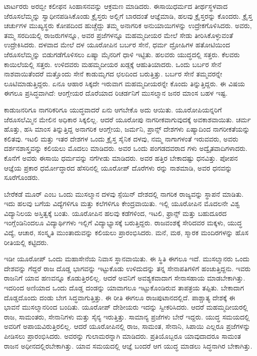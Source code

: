 \vskip 3pt

ಟಾರ್ಟರರು ಅರಬ್ಬೀ ಕಲೀಫನ ಸಿಂಹಾಸನವನ್ನು ಆಕ್ರಮಣ ಮಾಡಿದರು. ಈಸಾಯಿ\break ಧರ್ಮದ ತೀರ್ಥಸ್ಥಳವಾದ ಜೆರೂಸಲೆಮ್ಮನ್ನು ಸ್ವಾಧೀನಪಡಿಸಿಕೊಂಡು ಕ್ರೈಸ್ತರು ಅಲ್ಲಿಗೆ ಬಾರದಂತೆ ಆಜ್ಞೆಮಾಡಿ, ಹಲವು ಕ್ರೈಸ್ತರನ್ನು ಕೊಂದರು. ಕ್ರೈಸ್ತ ಚರ್ಚುಗಳ ಮುಖ್ಯಸ್ಥರು ಕೋಪದಿಂದ ಹುಚ್ಚೆದ್ದು ತಮ್ಮ ಅನಾಗರಿಕ ಅನುಯಾಯಿಗಳನ್ನು ಉದ್ರೇಕಗೊಳಿಸಿದರು. ಅವರು, ತಮ್ಮ ಸರದಿಯಲ್ಲಿ ರಾಜರುಗಳನ್ನೂ, ಅವರ ಪ್ರಜೆಗಳನ್ನೂ ಮಹಮ್ಮದೀಯರ ಮೇಲೆ ಸೇಡು ತೀರಿಸಿಕೊಳ್ಳುವಂತೆ ಉದ್ರೇಕಿಸಿದರು. ದಳವಾದ ಮೇಲೆ ದಳ ಯೂರೋಪಿನ ಬರ್ಬರ ಸೇನೆ, ಧರ್ಮ ದ್ರೋಹಿಗಳ ಹತೋಟಿಯಿಂದ ಜೆರೂಸಲೆಮ್ಮನ್ನು ಬಿಡುಗಡೆಗೊಳಿ\break ಸಲು ಏಷ್ಯಾ ಮೈನರಿಗೆ ಧಾಳಿ ಇಟ್ಟಿತು. ಹಲವರು ಯುದ್ಧದಲ್ಲಿ ಸತ್ತರು. ಕೆಲವರು ಕಾಯಿಲೆಯಲ್ಲಿ ಸತ್ತರು. ಉಳಿದವರು ಮಹಮ್ಮದೀಯರ ಖಡ್ಗಕ್ಕೆ ಆಹುತಿಯಾದರು. ಒಂದು ಬರ್ಬರ ಸೇನೆ ನಾಶವಾಯಿತೆಂದರೆ ಮತ್ತೊಂದು ಸೇನೆ ಕಾಡುಮೃಗದ ಛಲದಿಂದ ಬರುತ್ತಿತ್ತು. ಬರ್ಬರ ಸೇನೆ ತಮ್ಮವರನ್ನೇ ಲೂಟಿಮಾಡುತ್ತಿದ್ದರು. ಏನೂ ಆಹಾರ ಸಿಕ್ಕದೇ ಇರುವಾಗ ಮಹಮ್ಮದೀಯರನ್ನೇ ಕೊಂದು ತಿನ್ನುತ್ತಿದ್ದರು. ಈ ವಿಷಯ ಈಗಲೂ ಪ್ರಸಿದ್ಧ\break ವಾಗಿದೆ: ಆಂಗ್ಲೇಯರ ದೊರೆಯಾದ ರಿಚರ್ಡನಿಗೆ ಮುಸಲ್ಮಾನ ಜನರ ಮಾಂಸ ಬಹಳ ಇಷ್ಟ.

\vskip 3pt

ಕಾಡುಜನರಿಗೂ ನಾಗರಿಕರಿಗೂ ಯುದ್ಧವಾದರೆ ಏನು ಆಗಬೇಕೊ ಅದು ಆಯಿತು. ಯೂರೋಪಿಯನ್ನರಿಗೆ ಜೆರೂಸಲೆಮ್ಮಿನ ಮೇಲಿನ ಅಧಿಕಾರ ಸಿಕ್ಕಲಿಲ್ಲ. ಆದರೆ ಯೂರೋಪು ನಾಗರೀಕವಾಗುವುದಕ್ಕೆ ಅವಕಾಶವಾಯಿತು. ಚರ್ಮ ಹೊತ್ತು, ಹಸಿ ಮಾಂಸ ತಿನ್ನುತ್ತಿದ್ದ ಅನಾಗರಿಕ ಆಂಗ್ಲೇಯ, ಜರ್ಮನಿ, ಪ್ರಾನ್ಸ್​ ದೇಶಗಳು ಏಷ್ಯಾದಿಂದ ನಾಗರೀಕತೆಯನ್ನು ಕಲಿತವು. ಇಟಲಿ ಮತ್ತು ಇತರ ದೇಶಗಳ ಒಂದು ಕ್ರೈಸ್ತ ಸೈನಿಕ ದಳವು, ನಮ್ಮ ನಾಗಾಗಳಂತೆ ಇರುವವರು, ಅವರು ದರ್ಶನಶಾಸ್ತ್ರವನ್ನು ಕಲಿಯಲು ಮೊದಲು ಮಾಡಿದರು. ಅವರ ಒಂದು ಪಂಗಡದವರಾದ ಗಳು ಅದ್ವೈತವಾದಿಗಳಾದರು. ಕೊನೆಗೆ ಅವರು ಈಸಾಯಿ ಧರ್ಮವನ್ನು ನಗೆಗೀಡು ಮಾಡಿದರು. ಅವರ ಹತ್ತಿರ ಬೇಕಾದಷ್ಟು ಧನವಿತ್ತು. ಪೋಪನ ಆಜ್ಞೆಯ ಪ್ರಕಾರ ಧರ್ಮೋದ್ಧಾರದ ಹೆಸರಿನಲ್ಲಿ ಯೂರೋಪ್​ ದೊರೆಗಳು ರನ್ನು ನಾಶಮಾಡಿ, ಅವರ ಧನವನ್ನು ಸೂರೆಗೊಂಡರು.

\vskip 3pt

ಬೇರೆಕಡೆ ಮೂರ್​ ಎಂಬ ಒಂದು ಮುಸಲ್ಮಾನ ದಳವು ಸ್ಪೆಯಿನ್​ ದೇಶದಲ್ಲಿ ನಾಗರಿಕ ರಾಜ್ಯವನ್ನು ಸ್ಥಾಪನೆ ಮಾಡಿತು. ಇದು ಹಲವು ಬಗೆಯ ವಿದ್ಯೆಗಳಿಗೂ ಮತ್ತು ಕಲೆಗಳಿಗೂ ಕೇಂದ್ರವಾಯಿತು. ಇಲ್ಲಿ ಯೂರೋಪಿನ ಮೊದಲನೇ ವಿಶ್ವ ವಿದ್ಯಾನಿಲಯ ಅಸ್ತಿತ್ವಕ್ಕೆ ಬಂತು. ಯೂರೋಪಿನ ಹಲವು ಕಡೆಗಳಿಂದ, ಇಟಲಿ, ಫ್ರಾನ್ಸ್​ ಮತ್ತು ಬಹುದೂರದ ಇಂಗ್ಲೆಂಡಿನಿಂದಲೂ ವಿದ್ಯಾರ್ಥಿಗಳು ಇಲ್ಲಿಗೆ ವಿದ್ಯಾಭ್ಯಾಸಕ್ಕೆ ಬರುತ್ತಿದ್ದರು. ರಾಜವಂಶಕ್ಕೆ ಸೇರಿದವರ ಮಕ್ಕಳು, ಯುದ್ಧ ವಿದ್ಯೆ, ಆಚಾರ, ಸಂಸ್ಕೃತಿ ಮುಂತಾದುವನ್ನು ಕಲಿಯಲು ಪ್ರಾರಂಭಿಸಿದರು. ಮನೆ, ಮಠ, ಸ್ಮಾರಕ ಮಂದಿರಗಳನ್ನು ಹೊಸ ರೀತಿಯಲ್ಲಿ ಕಟ್ಟಿದರು.

\vskip 3pt

ಇಡೀ ಯೂರೋಪ್​ ಒಂದು ಮಹಾಸೇನೆಯ ನಿವಾಸ ಸ್ಥಾನವಾಯಿತು. ಈ ಸ್ಥಿತಿ ಈಗಲೂ ಇದೆ. ಮುಸಲ್ಮಾನರು ಒಂದು ದೇಶವನ್ನು ಗೆದ್ದರೆ ರಾಜ ದೊಡ್ಡ ಭಾಗವನ್ನು ಇಟ್ಟುಕೊಡು ಉಳಿದುದನ್ನು ತನ್ನ ಸೇನಾಪತಿಗಳಿಗೆ ಹಂಚುತ್ತಿದ್ದನು. ಇವರು ರಾಜನಿಗೆ ಯಾವ ಹಣವನ್ನೂ ಕೊಡುತ್ತಿರಲಿಲ್ಲ. ಆದರೆ ಅವನಿಗೆ ಅವಶ್ಯಕವಾದಾಗ ಸೇನಾಸಹಾಯ ಮಾಡಬೇಕಾಗಿತ್ತು. ಇದರಿಂದ ಅಣಿಯಾದ ಒಂದು ದೊಡ್ಡ ದಂಡನ್ನು ಯಾವಾಗಲೂ ಇಟ್ಟುಕೊಂಡಿರುವ ತಾಪತ್ರಯ ತಪ್ಪಿತು. ಬೇಕಾದಾಗ ದೊಡ್ಡದೊಂದು ದಂಡು ಬೇಗ ಸಿದ್ಧವಾಗುತ್ತಿತ್ತು. ಈ ರೀತಿ ಈಗಲೂ ರಾಜಪುಟಾನದಲ್ಲಿದೆ. ಪಾಶ್ಚಾತ್ಯ ದೇಶಕ್ಕೆ ಈ ಭಾವನೆ ಮುಸಲ್ಮಾನರಿಂದ ಬಂದಿತು. ಯೂರೋಪ್​ ದೇಶೀಯರು ಇದನ್ನು ಸ್ವೀಕರಿಸಿದರು. ಆದರೆ ಮಹಮ್ಮದೀಯರಲ್ಲಿ ರಾಜ, ಸಾಮಂತರು, ಸೇನಾನಿಗಳು ಮತ್ತು ಸೈನ್ಯ ಇರುತ್ತಿತ್ತು. ಸಾಮಾನ್ಯ ಪ್ರಜೆಗಳು ಬೇರೆ ಇದ್ದರು. ಯುದ್ಧ ಸಮಯದಲ್ಲಿ ಅವರಿಗೆ ಅಪಾಯವಿರುತ್ತಿರಲಿಲ್ಲ. ಆದರೆ ಯೂರೋಪಿನಲ್ಲಿ ರಾಜ, ಸಾಮಂತ, ಸೇನಾನಿ, ಸಿಪಾಯಿ ಎಲ್ಲರೂ ಪ್ರಜೆಗಳನ್ನು ಪೀಡಿಸಲು ಪ್ರಾರಂಭಿಸಿದರು. ಅವರನ್ನು ಗುಲಾಮರನ್ನಾಗಿ ಮಾಡಿದರು. ಪ್ರತಿಯೊಬ್ಬರೂ ಯಾವುದಾದರೂ ಸಾಮಂತ ರಾಜನ ಅಧೀನದಲ್ಲಿರಬೇಕಾಗಿತ್ತು. ಯಾವ ಸಮಯದಲ್ಲಿ ಆಜ್ಞೆ ಬಂದರೆ ಆಗ ಯುದ್ಧ ಮಾಡಲು ಸಿದ್ಧನಾಗಿರ ಬೇಕಾಗಿತ್ತು.

